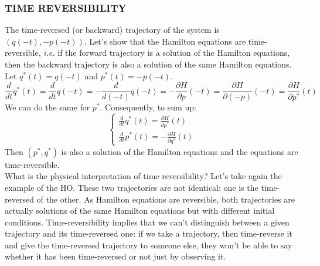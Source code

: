     \subsubsection{TIME REVERSIBILITY}
    The time-reversed (or backward) trajectory of the system is $(q(-t),-p(-t))$. Let's show that the Hamilton equations are time-reversible, \textit{i.e.} if the forward trajectory is a solution of the Hamilton equations, then the backward trajectory is also a solution of the same Hamilton equations.
    \\Let $q^*(t)=q(-t)$ and $p^*(t)=-p(-t)$.
    \begin{equation}
        \frac{d}{dt}q^*(t)=\frac{d}{dt}q(-t)=-\frac{d}{d(-t)}q(-t)=-\frac{\partial H}{\partial p}(-t)=\frac{\partial H}{\partial (-p)}(-t)=\frac{\partial H}{\partial p^*}(t)
    \end{equation}
    We can do the same for $p^*$. Consequently, to sum up:
    \begin{equation}
        \begin{cases}
            \frac{d}{dt}q^*(t)=\frac{\partial H}{\partial p^*}(t)\\
            \frac{d}{dt}p^*(t)=-\frac{\partial H}{\partial q^*}(t)
        \end{cases}
    \end{equation}
    Then $(p^*,q^*)$ is also a solution of the Hamilton equations and the equations are time-reversible.
    \\What is the physical interpretation of time reversibility? Let's take again the example of the HO.
    These two trajectories are not identical: one is the time-reversed of the other. As Hamilton equations are reversible, both trajectories are actually solutions of the same Hamilton equations but with different initial conditions. Time-reversibility implies that we can't distinguish between a given trajectory and its time-reversed one: if we take a trajectory, then time-reverse it and give the time-reversed trajectory to someone else, they won't be able to say whether it has been time-reversed or not just by observing it.
    
